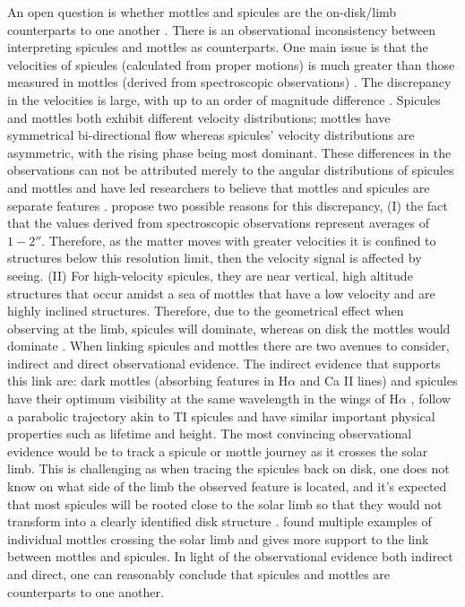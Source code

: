 % 
An open question is whether mottles and spicules are the on-disk/limb counterparts to one another \citep{Tsiropoula1993A}. There is an observational inconsistency between interpreting spicules and mottles as counterparts. One main issue is that the velocities of spicules (calculated from proper motions) is much greater than those measured in mottles (derived from spectroscopic observations) \citep{Grossmann1992AA264236G, Christopoulou2001SoPh19961C}. The discrepancy in the velocities is large, with up to an order of magnitude difference \citep{Grossmann1973SoPh28319G}. Spicules and mottles both exhibit different velocity distributions; mottles have symmetrical bi-directional flow whereas spicules' velocity distributions are asymmetric, with the rising phase being most dominant. These differences in the observations can not be attributed merely to the angular distributions of spicules and mottles \citep{Grossmann1992AA264236G} and have led researchers to believe that mottles and spicules are separate features \citep{Christopoulou2001SoPh19961C}. \cite{Christopoulou2001SoPh19961C} propose two possible reasons for this discrepancy, (I) the fact that the values derived from spectroscopic observations represent averages of $1-\ang{;;2}$. Therefore, as the matter moves with greater velocities it is confined to structures below this resolution limit, then the velocity signal is affected by seeing. (II) For high-velocity spicules, they are near vertical, high altitude structures that occur amidst a sea of mottles that have a low velocity and are highly inclined structures. Therefore, due to the geometrical effect when observing at the limb, spicules will dominate, whereas on disk the mottles would dominate \citep{Grossmann1992AA264236G}. \np
%
When linking spicules and mottles there are two avenues to consider, indirect and direct observational evidence. The indirect evidence that supports this link are: dark mottles (absorbing features in H$\alpha$ and Ca II lines) and spicules have their optimum visibility at the same wavelength in the wings of H$\alpha$ \citep{Tsiropoula1993A}, follow a parabolic trajectory akin to TI spicules \citep{Rouppe2007ApJ660L169R} and have similar important physical properties such as lifetime and height. The most convincing observational evidence would be to track a spicule or mottle journey as it crosses the solar limb. This is challenging as when tracing the spicules back on disk, one does not know on what side of the limb the observed feature is located, and it's expected that most spicules will be rooted close to the solar limb so that they would not transform into a clearly identified disk structure \citep{Beckers1968}. \cite{Christopoulou2001SoPh19961C} found multiple examples of individual mottles crossing the solar limb and gives more support to the link between mottles and spicules. In light of the observational evidence both indirect and direct, one can reasonably conclude that spicules and mottles are counterparts to one another.
